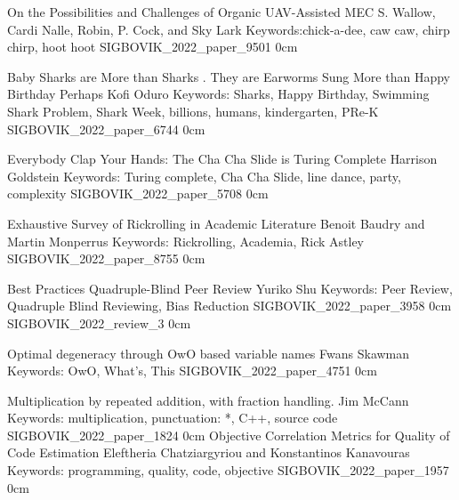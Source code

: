 \addpaper
    {On the Possibilities and Challenges of Organic UAV-Assisted MEC}
    {S. Wallow, Cardi Nalle, Robin, P. Cock, and Sky Lark}
    {Keywords:chick-a-dee, caw caw, chirp chirp, hoot hoot}
    {SIGBOVIK_2022_paper_9501}
    {0cm}
    {}


\addpaper
    {Baby Sharks are More than Sharks . They are Earworms Sung More than Happy Birthday Perhaps}
    {Kofi Oduro}
    {Keywords: Sharks, Happy Birthday, Swimming Shark Problem, Shark Week, billions, humans, kindergarten, PRe-K}
    {SIGBOVIK_2022_paper_6744}
    {0cm}
    {}



\addpaper
    {Everybody Clap Your Hands: The Cha Cha Slide is Turing Complete}
    {Harrison Goldstein}
    {Keywords: Turing complete, Cha Cha Slide, line dance, party, complexity}
    {SIGBOVIK_2022_paper_5708}
    {0cm}
    {}



\addpaper
    {Exhaustive Survey of Rickrolling in Academic Literature}
    {Benoit Baudry and Martin Monperrus}
    {Keywords: Rickrolling, Academia, Rick Astley}
    {SIGBOVIK_2022_paper_8755}
    {0cm}
    {}

\addtrack
    {}{Best Practices}
\addpaper
    {Quadruple-Blind Peer Review}
    {Yuriko Shu}
    {Keywords: Peer Review, Quadruple Blind Reviewing, Bias Reduction}
    {SIGBOVIK_2022_paper_3958}
    {0cm}
    {}
\addreview
    {SIGBOVIK_2022_review_3}
    {0cm}

\addpaper
    {Optimal degeneracy through OwO based variable names}
    {Fwans Skawman}
    {Keywords: OwO, What's, This}
    {SIGBOVIK_2022_paper_4751}
    {0cm}
    {}

\addpaper
    {Multiplication by repeated addition, with fraction handling.}
    {Jim McCann}
    {Keywords: multiplication, punctuation: *, C++, source code}
    {SIGBOVIK_2022_paper_1824}
    {0cm}
    {}
\addpaper
    {Objective Correlation Metrics for Quality of Code Estimation}
    {Eleftheria Chatziargyriou and Konstantinos Kanavouras}
    {Keywords: programming, quality, code, objective}
    {SIGBOVIK_2022_paper_1957}
    {0cm}
    {}


